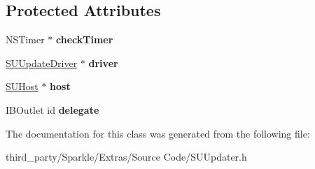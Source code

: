 \subsection*{Protected Attributes}
\begin{DoxyCompactItemize}
\item 
\mbox{\label{interface_s_u_updater_af76fc6ae8d2fa075b5300aeed9169311}} 
N\+S\+Timer $\ast$ {\bfseries check\+Timer}
\item 
\mbox{\label{interface_s_u_updater_a0fc10da298abd6e9ab65986c20affee5}} 
\mbox{\hyperlink{interface_s_u_update_driver}{S\+U\+Update\+Driver}} $\ast$ {\bfseries driver}
\item 
\mbox{\label{interface_s_u_updater_a9d9449baa21a906e8bbfebfa0f329b7a}} 
\mbox{\hyperlink{interface_s_u_host}{S\+U\+Host}} $\ast$ {\bfseries host}
\item 
\mbox{\label{interface_s_u_updater_a57ecb6dd74671ff068427697dfdea9c9}} 
I\+B\+Outlet id {\bfseries delegate}
\end{DoxyCompactItemize}


The documentation for this class was generated from the following file\+:\begin{DoxyCompactItemize}
\item 
third\+\_\+party/\+Sparkle/\+Extras/\+Source Code/S\+U\+Updater.\+h\end{DoxyCompactItemize}
